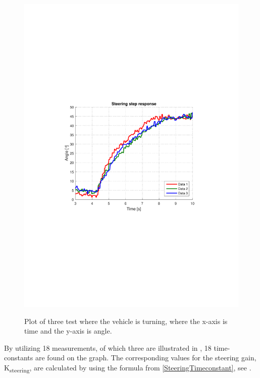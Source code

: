 \begin{figure}[H]
  \centering
  {
    \includegraphics[width=1.2\textwidth]{figures/steeringStep_P2.pdf}
  }
  \caption{Plot of three test where the vehicle is turning, where the x-axis is time and the y-axis is angle.}
  \label{fig:steeringAngleVsTimeKvKp}
\end{figure}\vspace{-5mm}
%
By utilizing 18 measurements, of which three are illustrated in , 18 time-constants are found on the graph. The corresponding values for the steering gain, \si{K_{steering}}, are calculated by using the formula from \eqref{SteeringTimeconstant}, see .

